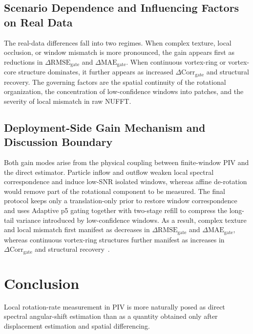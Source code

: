 \documentclass[lettersize,journal]{IEEEtran}
\begin{document}
\subsection{Scenario Dependence and Influencing Factors on Real Data}

The real-data differences fall into two regimes.
When complex texture, local occlusion, or window mismatch is more pronounced, the gain appears first as reductions in $\Delta\mathrm{RMSE}_{\mathrm{gate}}$ and $\Delta\mathrm{MAE}_{\mathrm{gate}}$.
When continuous vortex-ring or vortex-core structure dominates, it further appears as increased $\Delta\mathrm{Corr}_{\mathrm{gate}}$ and structural recovery.
The governing factors are the spatial continuity of the rotational organization, the concentration of low-confidence windows into patches, and the severity of local mismatch in raw NUFFT.

\subsection{Deployment-Side Gain Mechanism and Discussion Boundary}

Both gain modes arise from the physical coupling between finite-window PIV and the direct estimator.
Particle inflow and outflow weaken local spectral correspondence and induce low-SNR isolated windows, whereas affine de-rotation would remove part of the rotational component to be measured.
The final protocol keeps only a translation-only prior to restore window correspondence and uses Adaptive p5 gating together with two-stage refill to compress the long-tail variance introduced by low-confidence windows.
As a result, complex texture and local mismatch first manifest as decreases in $\Delta\mathrm{RMSE}_{\mathrm{gate}}$ and $\Delta\mathrm{MAE}_{\mathrm{gate}}$, whereas continuous vortex-ring structures further manifest as increases in $\Delta\mathrm{Corr}_{\mathrm{gate}}$ and structural recovery~\cite{Walbecq2024Boundary,Willert2025WSS,Elrefaie2024StereoPIV}.

\FloatBarrier

\section{Conclusion}
\label{sec:conclusion}

Local rotation-rate measurement in PIV is more naturally posed as direct spectral angular-shift estimation than as a quantity obtained only after displacement estimation and spatial differencing.
\end{document}
